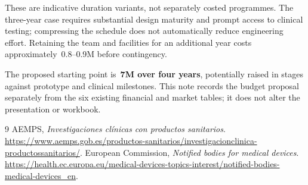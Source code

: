 \documentclass[11pt,a4paper]{article}
\begin{document}
These are indicative duration variants, not separately costed programmes.
The three-year case requires substantial design maturity and prompt access
to clinical testing; compressing the schedule does not automatically reduce
engineering effort. Retaining the team and facilities for an additional year
costs approximately \EUR\,0.8--0.9M before contingency.

The proposed starting point is \textbf{\EUR\,7M over four years}, potentially
raised in stages against prototype and clinical milestones. This note records
the budget proposal separately from the six existing financial and market
tables; it does not alter the presentation or workbook.

\begin{thebibliography}{9}
\small
{} AEMPS, \emph{Investigaciones cl\'inicas con productos sanitarios}.
\url{https://www.aemps.gob.es/productos-sanitarios/investigacionclinica-productossanitarios/}.
 European Commission, \emph{Notified bodies for medical devices}.
\url{https://health.ec.europa.eu/medical-devices-topics-interest/notified-bodies-medical-devices_en}.
\end{thebibliography}
\end{document}
